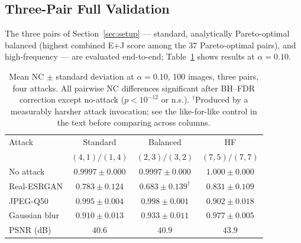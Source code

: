 \documentclass[conference]{IEEEtran}
\begin{document}
\subsection{Three-Pair Full Validation}
\label{sec:pairs}

The three pairs of Section~\ref{sec:setup} --- standard, analytically
Pareto-optimal balanced (highest combined E+J score among the 37
Pareto-optimal pairs), and high-frequency --- are evaluated end-to-end;
Table~\ref{tab:pairs} shows results at $\alpha=0.10$.

\begin{table}[t]
\caption{Mean NC $\pm$ standard deviation at $\alpha=0.10$, 100 images,
three pairs, four attacks. All pairwise NC differences significant after
BH--FDR correction except no-attack ($p < 10^{-12}$ or n.s.).
$^\dagger$Produced by a measurably harsher attack invocation; see the
like-for-like control in the text before comparing across columns.}
\label{tab:pairs}
\centering
\begin{tabular}{lccc}
\toprule
Attack & Standard & Balanced & HF \\
       & $(4,1)/(1,4)$ & $(2,3)/(3,2)$ & $(7,5)/(7,7)$ \\
\midrule
No attack      & $0.9997 \pm 0.000$ & $0.9997 \pm 0.000$ & $1.000 \pm 0.000$ \\
Real-ESRGAN    & $0.783 \pm 0.124$ & $0.683 \pm 0.139^\dagger$   & $0.831 \pm 0.109$ \\
JPEG-Q50       & $0.995 \pm 0.004$ & $0.998 \pm 0.001$   & $0.902 \pm 0.018$ \\
Gaussian blur  & $0.910 \pm 0.013$ & $0.933 \pm 0.011$   & $0.977 \pm 0.005$ \\
\midrule
PSNR (dB)      & $40.6$ & $40.9$ & $43.9$ \\
\bottomrule
\end{tabular}
\end{table}
\end{document}

